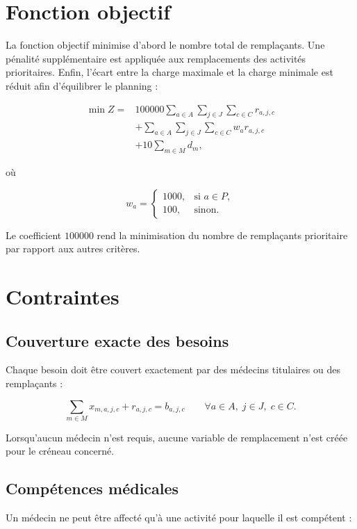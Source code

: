 \documentclass[11pt,a4paper]{article}
\begin{document}
\section{Fonction objectif}

La fonction objectif minimise d'abord le nombre total de remplaçants. Une
pénalité supplémentaire est appliquée aux remplacements des activités
prioritaires. Enfin, l'écart entre la charge maximale et la charge minimale
est réduit afin d'équilibrer le planning :

\begin{align*}
\min Z ={}& 100000 \sum_{a\in A}\sum_{j\in J}\sum_{c\in C} r_{a,j,c} \\
&+ \sum_{a\in A}\sum_{j\in J}\sum_{c\in C}
    w_a r_{a,j,c} \\
&+ 10 \sum_{m\in M}d_m,
\end{align*}

où

\[
w_a =
\begin{cases}
1000, & \text{si } a\in P,\\
100, & \text{sinon.}
\end{cases}
\]

Le coefficient $100000$ rend la minimisation du nombre de remplaçants
prioritaire par rapport aux autres critères.

\section{Contraintes}

\subsection{Couverture exacte des besoins}

Chaque besoin doit être couvert exactement par des médecins titulaires ou des
remplaçants :

\[
\sum_{m\in M} x_{m,a,j,c} + r_{a,j,c} = b_{a,j,c}
\qquad \forall a\in A,\;j\in J,\;c\in C.
\]

Lorsqu'aucun médecin n'est requis, aucune variable de remplacement n'est
créée pour le créneau concerné.

\subsection{Compétences médicales}

Un médecin ne peut être affecté qu'à une activité pour laquelle il est
compétent :
\end{document}
